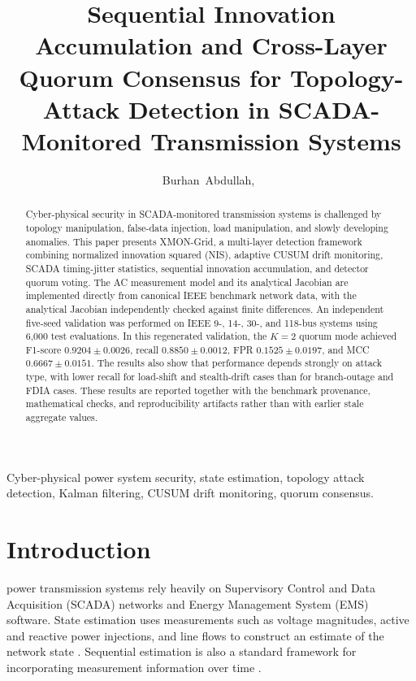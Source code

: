 \documentclass[journal]{IEEEtran}
\begin{document}
\title{Sequential Innovation Accumulation and Cross-Layer Quorum Consensus for Topology-Attack Detection in SCADA-Monitored Transmission Systems}

\author{Burhan~Abdullah,~}

\maketitle

\begin{abstract}
Cyber-physical security in SCADA-monitored transmission systems is challenged by topology manipulation, false-data injection, load manipulation, and slowly developing anomalies. This paper presents XMON-Grid, a multi-layer detection framework combining normalized innovation squared (NIS), adaptive CUSUM drift monitoring, SCADA timing-jitter statistics, sequential innovation accumulation, and detector quorum voting. The AC measurement model and its analytical Jacobian are implemented directly from canonical IEEE benchmark network data, with the analytical Jacobian independently checked against finite differences. An independent five-seed validation was performed on IEEE 9-, 14-, 30-, and 118-bus systems using 6,000 test evaluations. In this regenerated validation, the $K=2$ quorum mode achieved F1-score $0.9204\pm0.0026$, recall $0.8850\pm0.0012$, FPR $0.1525\pm0.0197$, and MCC $0.6667\pm0.0151$. The results also show that performance depends strongly on attack type, with lower recall for load-shift and stealth-drift cases than for branch-outage and FDIA cases. These results are reported together with the benchmark provenance, mathematical checks, and reproducibility artifacts rather than with earlier stale aggregate values.
\end{abstract}

\begin{IEEEkeywords}
Cyber-physical power system security, state estimation, topology attack detection, Kalman filtering, CUSUM drift monitoring, quorum consensus.
\end{IEEEkeywords}

\section{Introduction}
 power transmission systems rely heavily on Supervisory Control and Data Acquisition (SCADA) networks and Energy Management System (EMS) software. State estimation uses measurements such as voltage magnitudes, active and reactive power injections, and line flows to construct an estimate of the network state \cite{Abur2004,Monticelli1999}. Sequential estimation is also a standard framework for incorporating measurement information over time \cite{Simon2006}.
\end{document}
